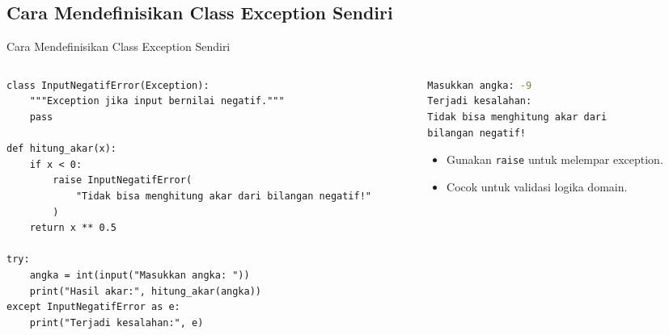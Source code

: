 \documentclass[aspectratio=169, table]{beamer}
\begin{document}
\subsection*{Cara Mendefinisikan Class Exception Sendiri}
\begin{frame}[fragile]{Cara Mendefinisikan Class Exception Sendiri}
\vspace*{10pt}
\begin{columns}
\begin{column}[t]{0.60\textwidth}
\begin{lstlisting}[style=PythonStyle, basicstyle=\ttfamily\scriptsize]
class InputNegatifError(Exception):
    """Exception jika input bernilai negatif."""
    pass

def hitung_akar(x):
    if x < 0:
        raise InputNegatifError(
            "Tidak bisa menghitung akar dari bilangan negatif!"
        )
    return x ** 0.5

try:
    angka = int(input("Masukkan angka: "))
    print("Hasil akar:", hitung_akar(angka))
except InputNegatifError as e:
    print("Terjadi kesalahan:", e)
\end{lstlisting}
\end{column}

\begin{column}[t]{0.35\textwidth}
\begin{lstlisting}[language=bash]
Masukkan angka: -9
Terjadi kesalahan: 
Tidak bisa menghitung akar dari 
bilangan negatif!
\end{lstlisting}

\begin{itemize}
  \item Gunakan \texttt{raise} untuk melempar exception.
  \item Cocok untuk validasi logika domain.
\end{itemize}
\end{column}
\end{columns}
\end{frame}

\end{document}
